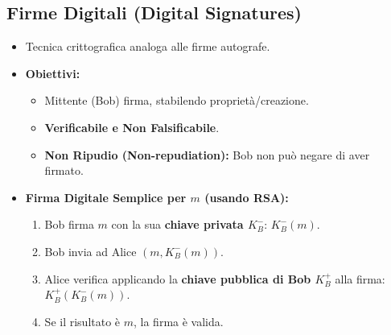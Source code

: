 \subsection{Firme Digitali (Digital Signatures)}
\begin{itemize}
    \item Tecnica crittografica analoga alle firme autografe.
    \item \textbf{Obiettivi:}
    \begin{itemize}
        \item Mittente (Bob) firma, stabilendo proprietà/creazione.
        \item \textbf{Verificabile e Non Falsificabile}.
        \item \textbf{Non Ripudio (Non-repudiation):} Bob non può negare di aver firmato.
    \end{itemize}
    \item \textbf{Firma Digitale Semplice per $m$ (usando RSA):}
    \begin{enumerate}
        \item Bob firma $m$ con la sua \textbf{chiave privata $K_B^-$}: $K_B^-(m)$.
        \item Bob invia ad Alice $(m, K_B^-(m))$.
        \item Alice verifica applicando la \textbf{chiave pubblica di Bob $K_B^+$} alla firma: $K_B^+(K_B^-(m))$.
        \item Se il risultato è $m$, la firma è valida.
    \end{enumerate}
\end{itemize}

